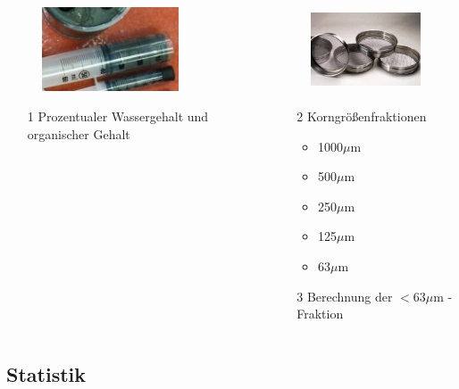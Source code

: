 \documentclass{beamer}
\begin{document}
\begin{frame}[t]
\begin{columns}[t]
\begin{column}{6.4cm}
\begin{figure}
\includegraphics[height=25mm]{images/Fotos/spritze.jpg}
\hspace*{-8mm}
\end{figure}
\begin{enumerate}
\item[1] Prozentualer Wassergehalt und organischer Gehalt
\end{enumerate}
\end{column}
\begin{column}{6.4cm}
\begin{figure}
\includegraphics[height=25mm]{images/Fotos/Siebe2.jpeg}
\hspace*{+8mm}
\end{figure}
\begin{enumerate}
\item[2] Korngrößenfraktionen
\begin{itemize}
\item 1000$ \mu$m 
\item 500$ \mu$m 
\item 250$ \mu$m 
\item 125$\mu$m 
\item 63$ \mu$m 
\end{itemize}
\item[3] Berechnung der $<63 \mu$m 
-Fraktion
\end{enumerate}
\end{column}
\end{columns}
\end{frame}

\subsection{Statistik}
\end{document}
